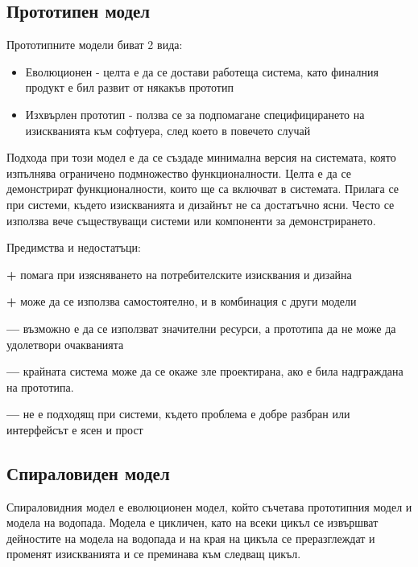 \documentclass[fleqn,12pt]{article}
\begin{document}
\subsection{Прототипен модел}
Прототипните модели биват 2 вида:

\begin{itemize}
	\item Еволюционен - целта е да се достави работеща система, като финалния продукт е бил развит от някакъв прототип
	\item Изхвърлен прототип - ползва се за подпомагане специфицирането на изискванията към софтуера, след което в повечето случай 
\end{itemize}

Подхода при този модел е да се създаде минимална версия на системата, която изпълнява ограничено подмножество функционалности. Целта е да се демонстрират функционалности, които ще са включват в системата. Прилага се при системи, където изискванията и дизайнът не са достатъчно ясни. Често се използва вече съществуващи системи или компоненти за демонстрирането.

Предимства и недостатъци:
\begin{description}
	\item \textbf{+} помага при изясняването на потребителските изисквания и дизайна
	\item \textbf{+} може да се използва самостоятелно, и в комбинация с други модели
	\item \textbf{---} възможно е да се използват значителни ресурси, а прототипа да не може да удолетвори очакванията
	\item \textbf{---} крайната система може да се окаже зле проектирана, ако е била надграждана на прототипа.
	\item \textbf{---} не е подходящ при системи, където проблема е добре разбран или интерфейсът е ясен и прост
\end{description}

\subsection{Спираловиден модел}
Спираловидния модел е еволюционен модел, който съчетава прототипния модел и модела на водопада. Модела е цикличен, като на всеки цикъл се извършват дейностите на модела на водопада и на края на цикъла се преразглеждат и променят изискванията и се преминава към следващ цикъл.
\end{document}
